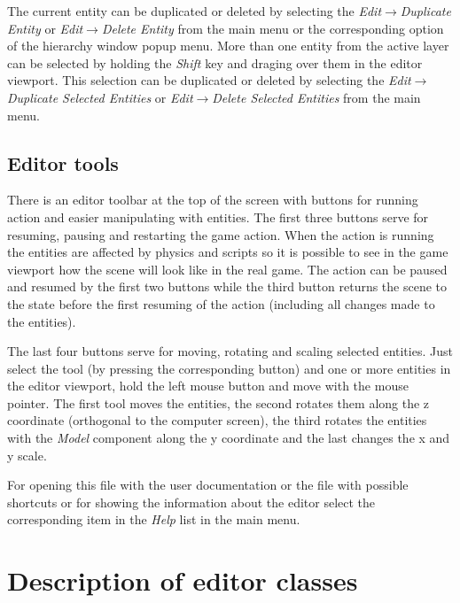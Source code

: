
The current entity can be duplicated or deleted by selecting the \emph{Edit}$\rightarrow$\emph{Du\-pli\-ca\-te Entity} or \emph{Edit}$\rightarrow$\emph{Delete Entity} from the main menu or the corresponding option of the hierarchy window popup menu. More than one entity from the active layer can be selected by holding the \emph{Shift} key and draging over them in the editor viewport. This selection can be duplicated or deleted by selecting the \emph{Edit}$\rightarrow$\emph{Duplicate Selected Entities} or \emph{Edit}$\rightarrow$\emph{Delete Selected Entities} from the main menu.


\subsection{Editor tools}

There is an editor toolbar at the top of the screen with buttons for running action and easier manipulating with entities. The first three buttons serve for resuming, pausing and restarting the game action. When the action is running the entities are affected by physics and scripts so it is possible to see in the game viewport how the scene will look like in the real game. The action can be paused and resumed by the first two buttons while the third button returns the scene to the state before the first resuming of the action (including all changes made to the entities).

The last four buttons serve for moving, rotating and scaling selected entities. Just select the tool (by pressing the corresponding button) and one or more entities in the editor viewport, hold the left mouse button and move with the mouse pointer. The first tool moves the entities, the second rotates them along the z coordinate (orthogonal to the computer screen), the third rotates the entities with the \emph{Model} component along the y coordinate and the last changes the x and y scale.

For opening this file with the user documentation or the file with possible shortcuts or for showing the information about the editor select the corresponding item in the \emph{Help} list in the main menu.

\section{Description of editor classes}

